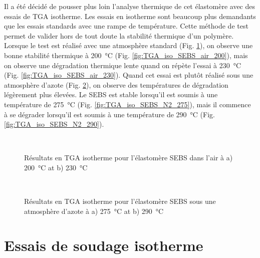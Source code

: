 Il a été décidé de pousser plus loin l'analyse thermique de cet élastomère avec des essais de TGA isotherme. 
Les essais en isotherme sont beaucoup plus demandants que les essais standards avec une rampe de température. 
Cette méthode de test permet de valider hors de tout doute la stabilité thermique d'un polymère. 
Lorsque le test est réalisé avec une atmosphère standard (Fig. \ref{fig:TGA_iso_SEBS_air}), on observe une bonne stabilité thermique à \SI[locale=FR]{200}{\celsius} (Fig. \ref{fig:TGA_iso_SEBS_air_200}), mais on observe une dégradation thermique lente quand on répète l'essai à \SI[locale=FR]{230}{\celsius} (Fig. \ref{fig:TGA_iso_SEBS_air_230}). 
Quand cet essai est plutôt réalisé sous une atmosphère d'azote (Fig. \ref{fig:TGA_iso_SEBS_N2}), on observe des températures de dégradation légèrement plus élevées. 
Le SEBS est stable lorsqu'il est soumis à une température de \SI[locale=FR]{275}{\celsius} (Fig. \ref{fig:TGA_iso_SEBS_N2_275}), mais il commence à se dégrader lorsqu'il est soumis à une température de \SI[locale=FR]{290}{\celsius} (Fig. \ref{fig:TGA_iso_SEBS_N2_290}). 

\begin{figure}[h]
	\centering
	\\
	\caption{Résultats en TGA isotherme pour l'élastomère SEBS dans l'air à a) \SI{200}{\celsius} at b) \SI{230}{\celsius}}
	\label{fig:TGA_iso_SEBS_air}
\end{figure}

\begin{figure}[h]
	\centering
	\\
	\caption{Résultats en TGA isotherme pour l'élastomère SEBS sous une atmosphère d'azote à a) \SI{275}{\celsius} at b) \SI{290}{\celsius}}
	\label{fig:TGA_iso_SEBS_N2}
\end{figure}

\section{Essais de soudage isotherme}

